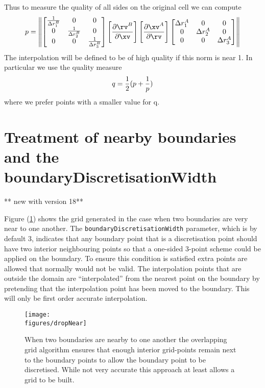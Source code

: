 Thus to measure the quality of all sides on the original cell we can compute
\[
   p = 
   \left\| \begin{bmatrix} {1\over\Delta r_1^B} & 0 & 0 \\
                          0 & {1\over\Delta r_2^B} & 0  \\
                          0 & 0 & {1\over\Delta r_3^B}  \end{bmatrix} 
   \left[ {\partial \rv^B \over \partial \xv} \right]
   \left[ {\partial \xv^A \over \partial \rv }  \right]
          \begin{bmatrix} {\Delta r_1^A} & 0 & 0 \\
                          0 & {\Delta r_2^A} & 0  \\
                          0 & 0 & {\Delta r_3^A}  \end{bmatrix}  \right\|
\]
The interpolation will be defined to be of high quality if this norm is near 1.
In particular we use the quality measure
\[
    q = {1\over2}( p + {1\over p } )
\]
where we prefer points with a smaller value for q.

\clearpage
\section{Treatment of nearby boundaries and the boundaryDiscretisationWidth} 

** new with version 18**

Figure (\ref{fig:nearby}) shows the grid generated in the case when two boundaries are
very near to one another. The {\tt boundaryDiscretisationWidth} parameter, which is by default 3,
indicates that any boundary point that is a discretisation point should have two interior
neighbouring points so that a one-sided 3-point scheme could be applied on the boundary.
To ensure this condition is satisfied extra points are allowed that normally would not be valid.
The interpolation points that are outside the domain are ``interpolated'' from the nearest point
on the boundary by pretending that the interpolation point has been moved to the boundary. This 
will only be first order accurate interpolation. 

\begin{figure}[H]
\begin{center}
   \texttt{[image: \\figures/dropNear]}
\end{center}
\caption{When two boundaries are nearby to one another the overlapping grid algorithm
   ensures that enough interior grid-points remain next to the boundary points
   to allow the boundary point to be discretised. While not very accurate this approach
   at least allows a grid to be built.} \label{fig:nearby}
\end{figure}

